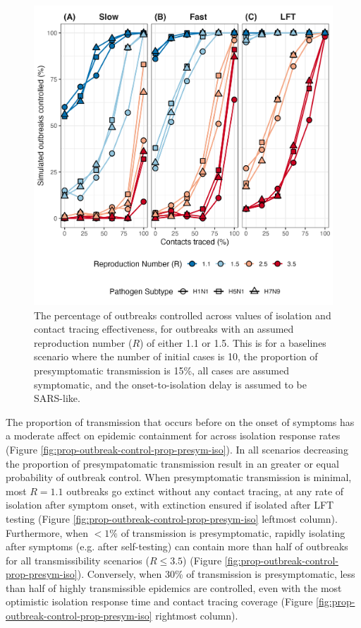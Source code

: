 \documentclass{article}
\begin{document}
\begin{figure}[ht]
\centering
\includegraphics[width=\textwidth]{../plots/prop_outbreak_control_reproduction_number.png}
\caption{The percentage of outbreaks controlled across values of isolation and contact tracing effectiveness, for outbreaks with an assumed reproduction number ($R$) of either 1.1 or 1.5. This is for a baselines scenario where the number of initial cases is 10, the proportion of presymptomatic transmission is 15\%, all cases are assumed symptomatic, and the onset-to-isolation delay is assumed to be SARS-like.}
\label{fig:prop-outbreak-control-R}
\end{figure}

\clearpage

The proportion of transmission that occurs before on the onset of symptoms has a moderate affect on epidemic containment for across isolation response rates (Figure \ref{fig:prop-outbreak-control-prop-presym-iso}). In all scenarios decreasing the proportion of presympatomatic transmission result in an greater or equal probability of outbreak control. When presymptomatic transmission is minimal, most $R = 1.1$ outbreaks go extinct without any contact tracing, at any rate of isolation after symptom onset, with extinction ensured if isolated after LFT testing (Figure \ref{fig:prop-outbreak-control-prop-presym-iso} leftmost column). Furthermore, when  $<1\%$ of transmission is presymptomatic, rapidly isolating after symptoms (e.g. after self-testing) can contain more than half of outbreaks for all transmissibility scenarios ($R \leq 3.5$) (Figure \ref{fig:prop-outbreak-control-prop-presym-iso}). Conversely, when 30\% of transmission is presymptomatic, less than half of highly transmissible epidemics are controlled, even with the most optimistic isolation response time and contact tracing coverage (Figure \ref{fig:prop-outbreak-control-prop-presym-iso} rightmost column). \\
\end{document}
